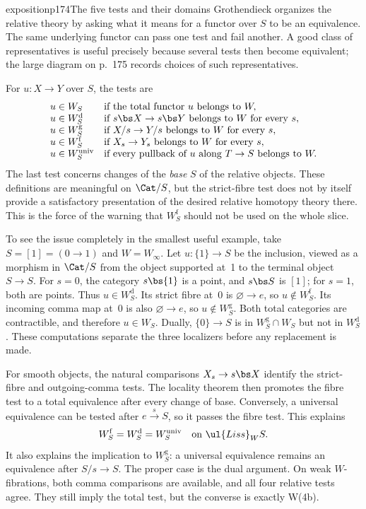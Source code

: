 \begin{dcomment}{exposition}{p174}{The five tests and their domains}
Grothendieck organizes the relative theory by asking what it means for a functor over $S$ to be an equivalence. The same underlying functor can pass one test and fail another. A good class of representatives is useful precisely because several tests then become equivalent; the large diagram on p.~175 records choices of such representatives.

For $u:X\to Y$ over $S$, the tests are
\[
\begin{array}{ll}
 u\in W_S & \text{if the total functor }u\text{ belongs to }W,\\
 u\in W_S^{\mathrm d} & \text{if }s\bs X\to s\bs Y\text{ belongs to }W\text{ for every }s,\\
 u\in W_S^{\mathrm g} & \text{if }X/s\to Y/s\text{ belongs to }W\text{ for every }s,\\
 u\in W_S^{\mathrm f} & \text{if }X_s\to Y_s\text{ belongs to }W\text{ for every }s,\\
 u\in W_S^{\mathrm{univ}} & \text{if every pullback of }u\text{ along }T\to S\text{ belongs to }W.
\end{array}
\]
The last test concerns changes of the \emph{base} $S$ of the relative objects. These definitions are meaningful on $\Cat/S$, but the strict-fibre test does not by itself provide a satisfactory presentation of the desired relative homotopy theory there. This is the force of the warning that $W_S^{\mathrm f}$ should not be used on the whole slice.

To see the issue completely in the smallest useful example, take $S=[1]=(0\to1)$ and $W=W_\infty$. Let $u:\{1\}\to S$ be the inclusion, viewed as a morphism in $\Cat/S$ from the object supported at~1 to the terminal object $S\to S$. For $s=0$, the category $s\bs\{1\}$ is a point, and $s\bs S$ is $[1]$; for $s=1$, both are points. Thus $u\in W_S^{\mathrm d}$. Its strict fibre at~0 is $\varnothing\to e$, so $u\notin W_S^{\mathrm f}$. Its incoming comma map at~0 is also $\varnothing\to e$, so $u\notin W_S^{\mathrm g}$. Both total categories are contractible, and therefore $u\in W_S$. Dually, $\{0\}\to S$ is in $W_S^{\mathrm g}\cap W_S$ but not in $W_S^{\mathrm d}$. These computations separate the three localizers before any replacement is made.

For smooth objects, the natural comparisons $X_s\to s\bs X$ identify the strict-fibre and outgoing-comma tests. The locality theorem then promotes the fibre test to a total equivalence after every change of base. Conversely, a universal equivalence can be tested after $e\xrightarrow{s}S$, so it passes the fibre test. This explains
\[
 W_S^{\mathrm f}=W_S^{\mathrm d}=W_S^{\mathrm{univ}}
 \quad\text{on }\ul{Liss}_W S.
\]
It also explains the implication to $W_S^{\mathrm g}$: a universal equivalence remains an equivalence after $S/s\to S$. The proper case is the dual argument. On weak $W$-fibrations, both comma comparisons are available, and all four relative tests agree. They still imply the total test, but the converse is exactly W(4b).


\end{dcomment}
